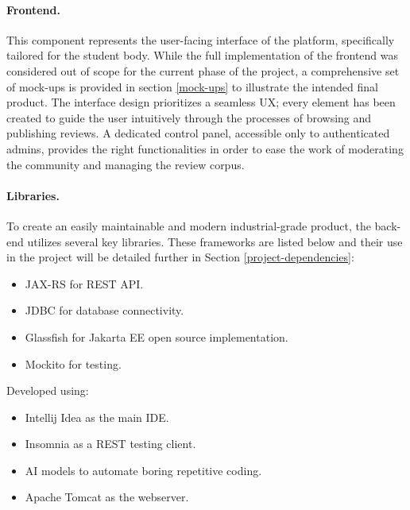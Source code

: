 \paragraph{\textbf{Frontend.}} This component represents the user-facing interface of the platform, specifically tailored for the student body. While the full implementation of the frontend was considered out of scope for the current phase of the project, a comprehensive set of mock-ups is provided in section \ref{mock-ups} to illustrate the intended final product. The interface design prioritizes a seamless UX; every element has been created to guide the user intuitively through the processes of browsing and publishing reviews. A dedicated control panel, accessible only to authenticated admins, provides the right functionalities in order to ease the work of moderating the community and managing the review corpus. 

\paragraph{\textbf{Libraries.}} To create an easily maintainable and modern industrial-grade product, the back-end utilizes several key libraries. These frameworks are listed below and their use in the project will be detailed further in Section \ref{project-dependencies}:

\begin{itemize}
	\item JAX-RS for REST API.
	\item JDBC for database connectivity.
	\item Glassfish for Jakarta EE open source implementation.
	\item Mockito for testing.
\end{itemize}

\noindent Developed using:

\begin{itemize}
	\item Intellij Idea as the main IDE.
	\item Insomnia as a REST testing client.
	\item AI models to automate boring repetitive coding.
	\item Apache Tomcat as the webserver.
\end{itemize}
\pagebreak